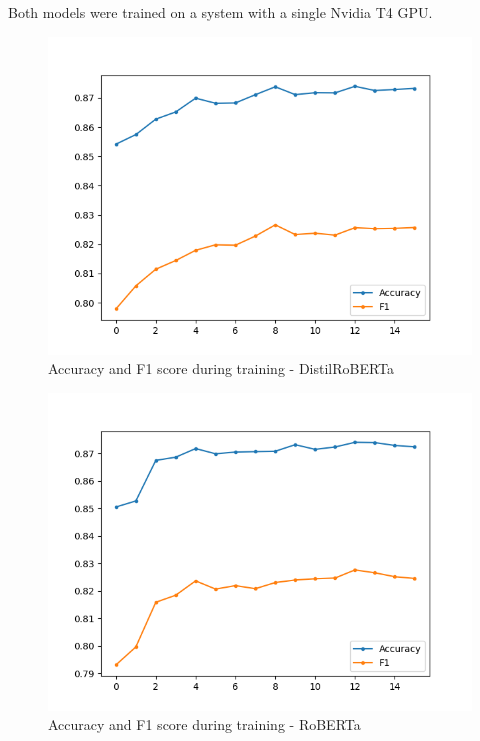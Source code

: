 \documentclass[10pt, a4paper]{article}
\begin{document}
Both models were trained on a system with a single Nvidia T4 GPU.

\begin{figure}
\begin{center}
\includegraphics[width=\columnwidth]{figures/train-metrics-distilroberta.png}
\caption{Accuracy and F1 score during training - DistilRoBERTa}
\label{fig:train-metrics-distilroberta}
\end{center}
\end{figure}

\begin{figure}
\begin{center}
\includegraphics[width=\columnwidth]{figures/train-metrics-roberta.png}
\caption{Accuracy and F1 score during training - RoBERTa}
\label{fig:train-metrics-roberta}
\end{center}
\end{figure}
\end{document}

